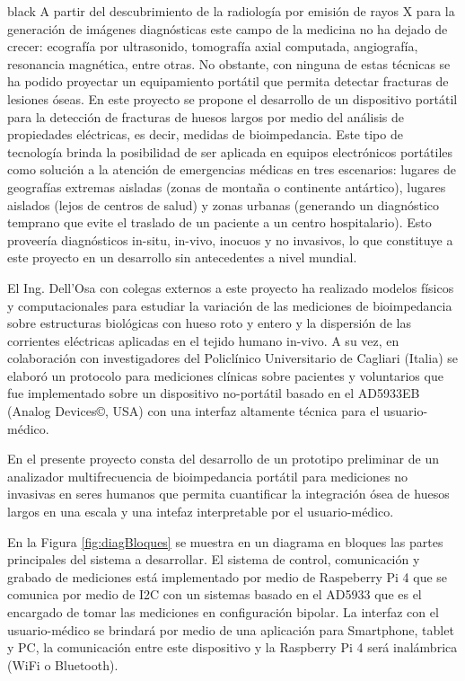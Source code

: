 \documentclass[11pt]{charter}
\begin{document}
\begin{consigna}{black}
A partir del descubrimiento de la radiología por emisión de rayos X para la generación de imágenes diagnósticas este campo de la medicina no ha dejado de crecer: ecografía por ultrasonido, tomografía axial computada, angiografía, resonancia magnética, entre otras. No obstante, con ninguna de estas técnicas se ha podido proyectar un equipamiento portátil que permita detectar fracturas de lesiones óseas. 
En este proyecto se propone el desarrollo de un dispositivo portátil para la detección de fracturas de huesos largos por medio del análisis de propiedades eléctricas, es decir, medidas de bioimpedancia. Este tipo de tecnología brinda la posibilidad de ser aplicada en equipos electrónicos portátiles como solución a la atención de emergencias médicas en tres escenarios: lugares de geografías extremas aisladas (zonas de montaña o continente antártico), lugares aislados (lejos de centros de salud) y zonas urbanas (generando un diagnóstico temprano que evite el traslado de un paciente a un centro hospitalario). Esto proveería diagnósticos in-situ, in-vivo, inocuos y no invasivos, lo que constituye a este proyecto en un desarrollo sin antecedentes a nivel mundial.

El Ing. Dell'Osa con colegas externos a este proyecto ha realizado modelos físicos y computacionales para estudiar la variación de las mediciones de bioimpedancia sobre estructuras biológicas con hueso roto y entero y la dispersión de las corrientes eléctricas aplicadas en el tejido humano in-vivo. A su vez, en colaboración con investigadores del Policlínico Universitario de Cagliari (Italia) se elaboró un protocolo para mediciones clínicas sobre pacientes y voluntarios que fue implementado sobre un dispositivo no-portátil basado en el AD5933EB (Analog Devices©, USA) con una interfaz altamente técnica para el usuario-médico.

En el presente proyecto consta del desarrollo de un prototipo preliminar de un analizador multifrecuencia de bioimpedancia portátil para mediciones no invasivas en seres humanos que permita cuantificar la integración ósea de huesos largos en una escala y una intefaz interpretable por el usuario-médico.

En la Figura \ref{fig:diagBloques} se muestra en un diagrama en bloques las partes principales del sistema a desarrollar. El sistema de control, comunicación y grabado de mediciones está implementado por medio de Raspeberry Pi 4 que se comunica por medio de I2C con un sistemas basado en el AD5933 que es el encargado de tomar las mediciones en configuración bipolar. La interfaz con el usuario-médico se brindará por medio de una aplicación para Smartphone, tablet y PC, la comunicación entre este dispositivo y la Raspberry Pi 4 será inalámbrica (WiFi o Bluetooth).


\end{consigna}
\end{document}

